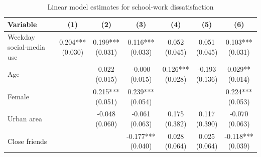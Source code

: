 \begin{table}[!htbp]
\centering
\caption{Linear model estimates for school-work dissatisfaction}
\label{tab:linear_models_schoolwork}
\scriptsize
\setlength{\tabcolsep}{3.2pt}
\renewcommand{\arraystretch}{0.9}
\begin{tabular}{p{}cccccc}
\hline
Variable & (1) & (2) & (3) & (4) & (5) & (6) \\
\hline
Weekday social-media use & \shortstack[c]{0.204*** \\[-0.35ex] (0.030)} & \shortstack[c]{0.199*** \\[-0.35ex] (0.031)} & \shortstack[c]{0.116*** \\[-0.35ex] (0.033)} & \shortstack[c]{0.052 \\[-0.35ex] (0.045)} & \shortstack[c]{0.051 \\[-0.35ex] (0.045)} & \shortstack[c]{0.103*** \\[-0.35ex] (0.031)}
\\
Age &  & \shortstack[c]{0.022 \\[-0.35ex] (0.015)} & \shortstack[c]{-0.000 \\[-0.35ex] (0.015)} & \shortstack[c]{0.126*** \\[-0.35ex] (0.028)} & \shortstack[c]{-0.193 \\[-0.35ex] (0.136)} & \shortstack[c]{0.029** \\[-0.35ex] (0.014)}
\\
Female &  & \shortstack[c]{0.215*** \\[-0.35ex] (0.051)} & \shortstack[c]{0.239*** \\[-0.35ex] (0.054)} &  &  & \shortstack[c]{0.224*** \\[-0.35ex] (0.053)}
\\
Urban area &  & \shortstack[c]{-0.048 \\[-0.35ex] (0.060)} & \shortstack[c]{-0.061 \\[-0.35ex] (0.063)} & \shortstack[c]{0.175 \\[-0.35ex] (0.382)} & \shortstack[c]{0.117 \\[-0.35ex] (0.390)} & \shortstack[c]{-0.070 \\[-0.35ex] (0.063)}
\\
Close friends &  &  & \shortstack[c]{-0.177*** \\[-0.35ex] (0.040)} & \shortstack[c]{0.028 \\[-0.35ex] (0.064)} & \shortstack[c]{0.025 \\[-0.35ex] (0.064)} & \shortstack[c]{-0.118*** \\[-0.35ex] (0.039)}

\end{tabular}
\end{table}

